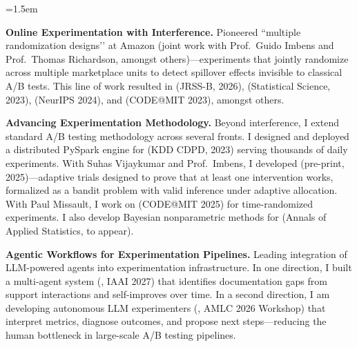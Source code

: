\documentclass[10pt, a4paper]{article}
\begin{document}
\medskip
{\leftskip=1.5em\relax

\noindent\textbf{Online Experimentation with Interference.}
Pioneered ``multiple randomization designs’’ at Amazon (joint work with Prof.\ Guido Imbens and Prof.\ Thomas Richardson, amongst others)---experiments that jointly randomize across multiple marketplace units to detect spillover effects invisible to classical A/B tests. This line of work resulted in \href{https://doi.org/10.1093/jrsssb/qkaf073}{\color{blue}{Multiple Randomization Designs}} (JRSS-B, 2026), \href{https://projecteuclid.org/journals/statistical-science/advance-publication/Experimental-Design-in-Marketplaces/10.1214/23-STS883.short}{\color{blue}{Experimental Design in Marketplaces}} (Statistical Science, 2023), \href{https://arxiv.org/abs/2405.18621}{\color{blue}{Multi-Armed Bandits with Network Interference}} (NeurIPS 2024), and \href{https://www.amazon.science/publications/efficient-switchback-experiments-via-multiple-randomization-designs}{\color{blue}{Efficient Switchback Experiments via MRDs}} (CODE@MIT 2023), amongst others.

\medskip\noindent\textbf{Advancing Experimentation Methodology.}
Beyond interference, I extend standard A/B testing methodology across several fronts. I designed and deployed a distributed PySpark engine for \href{https://proceedings.mlr.press/v218/masoero23a.html}{\color{blue}{covariate-adjusted causal estimation at scale}} (KDD CDPD, 2023) serving thousands of daily experiments. With Suhas Vijaykumar and Prof.\ Imbens, I developed \href{https://arxiv.org/abs/2603.06941}{\color{blue}{Demonstration Experiments}} (pre-print, 2025)---adaptive trials designed to prove that at least one intervention works, formalized as a bandit problem with valid inference under adaptive allocation. With Paul Missault, I work on \href{https://arxiv.org/abs/2506.12654}{\color{blue}{robust switchback designs}} (CODE@MIT 2025) for time-randomized experiments. I also develop Bayesian nonparametric methods for \href{https://arxiv.org/abs/2505.19643}{\color{blue}{traffic prediction in online experiments}} (Annals of Applied Statistics, to appear).

\medskip\noindent\textbf{Agentic Workflows for Experimentation Pipelines.}
Leading integration of LLM-powered agents into experimentation infrastructure. In one direction, I built a multi-agent system ({\color{blue}{TriAgent}}, IAAI 2027) that identifies documentation gaps from support interactions and self-improves over time. In a second direction, I am developing autonomous LLM experimenters ({\color{blue}{Agentic Experimentation}}, AMLC 2026 Workshop) that interpret metrics, diagnose outcomes, and propose next steps---reducing the human bottleneck in large-scale A/B testing pipelines.

\par}
\medskip
\end{document}

